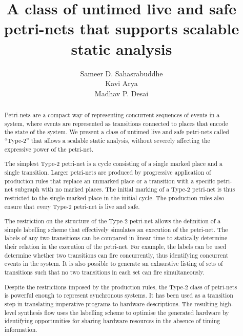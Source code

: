 \documentclass[12pt,a4paper]{article}
\title{A class of untimed live and safe petri-nets that supports
  scalable static analysis}
\author{Sameer D. Sahasrabuddhe \\ Kavi Arya \\ Madhav P. Desai}
\date{}
\begin{document}
\maketitle

\begin{abstract}
  \large

  Petri-nets are a compact way of representing concurrent sequences of
  events in a system, where events are represented as transitions
  connected to places that encode the state of the system. We present
  a class of untimed live and safe petri-nets called ``Type-2'' that
  allows a scalable static analysis, without severely affecting the
  expressive power of the petri-net.
  
  The simplest Type-2 petri-net is a cycle consisting of a single
  marked place and a single transition. Larger petri-nets are produced
  by progressive application of production rules that replace an
  unmarked place or a transition with a specific petri-net subgraph
  with no marked places. The initial marking of a Type-2 petri-net is
  thus restricted to the single marked place in the initial cycle. The
  production rules also ensure that every Type-2 petri-net is live and
  safe.

  The restriction on the structure of the Type-2 petri-net
  allows the definition of a simple labelling scheme that effectively
  simulates an execution of the petri-net. The labels of any two
  transitions can be compared in linear time to statically determine
  their relation in the execution of the petri-net. For example, the
  labels can be used determine whether two transitions can fire
  concurrently, thus identifying concurrent events in the system. It
  is also possible to generate an exhaustive listing of sets of
  transitions such that no two transitions in each set can fire
  simultaneously.

  Despite the restrictions imposed by the production rules, the Type-2
  class of petri-nets is powerful enough to represent synchronous
  systems. It has been used as a transition step in translating
  imperative programs to hardware descriptions\cite{ahir-thesis}. The
  resulting high-level synthesis flow uses the labelling scheme to
  optimise the generated hardware by identifying opportunities for
  sharing hardware resources in the absence of timing information.

\end{abstract}
\end{document}
